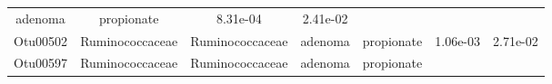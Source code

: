 \documentclass[11pt,]{article}
\begin{document}
\begin{longtable}[]{@{}ccccccc@{}}
\begin{minipage}[t]{0.09\columnwidth}
adenoma\strut
\end{minipage} & \begin{minipage}[t]{0.11\columnwidth}\centering\strut
propionate\strut
\end{minipage} & \begin{minipage}[t]{0.09\columnwidth}\centering\strut
8.31e-04\strut
\end{minipage} & \begin{minipage}[t]{0.09\columnwidth}\centering\strut
2.41e-02\strut
\end{minipage}\tabularnewline
\begin{minipage}[t]{0.09\columnwidth}\centering\strut
Otu00502\strut
\end{minipage} & \begin{minipage}[t]{0.17\columnwidth}\centering\strut
Ruminococcaceae\strut
\end{minipage} & \begin{minipage}[t]{0.17\columnwidth}\centering\strut
Ruminococcaceae\strut
\end{minipage} & \begin{minipage}[t]{0.09\columnwidth}\centering\strut
adenoma\strut
\end{minipage} & \begin{minipage}[t]{0.11\columnwidth}\centering\strut
propionate\strut
\end{minipage} & \begin{minipage}[t]{0.09\columnwidth}\centering\strut
1.06e-03\strut
\end{minipage} & \begin{minipage}[t]{0.09\columnwidth}\centering\strut
2.71e-02\strut
\end{minipage}\tabularnewline
\begin{minipage}[t]{0.09\columnwidth}\centering\strut
Otu00597\strut
\end{minipage} & \begin{minipage}[t]{0.17\columnwidth}\centering\strut
Ruminococcaceae\strut
\end{minipage} & \begin{minipage}[t]{0.17\columnwidth}\centering\strut
Ruminococcaceae\strut
\end{minipage} & \begin{minipage}[t]{0.09\columnwidth}\centering\strut
adenoma\strut
\end{minipage} & \begin{minipage}[t]{0.11\columnwidth}\centering\strut
propionate\strut
\end{minipage} & \begin{minipage}[t]{0.09\columnwidth}\centering\strut

\end{minipage}
\end{longtable}
\end{document}
